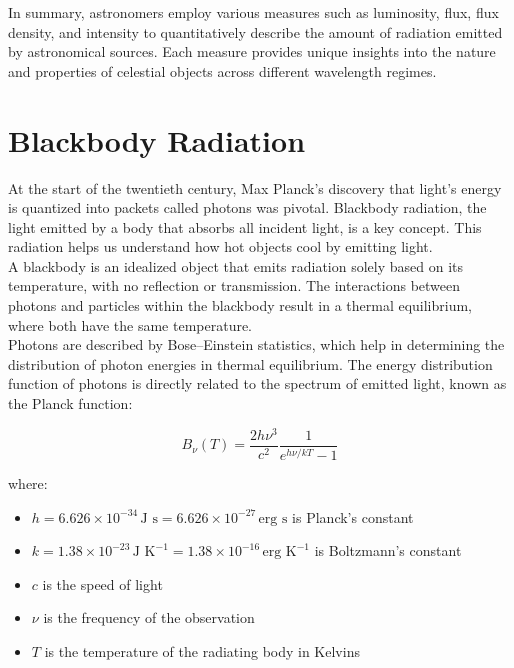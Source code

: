 In summary, astronomers employ various measures such as luminosity, flux, flux density, and intensity to quantitatively describe the amount of radiation emitted by astronomical sources. Each measure provides unique insights into the nature and properties of celestial objects across different wavelength regimes.

\section{Blackbody Radiation}
\label{sec:blackbodyradiation}

At the start of the twentieth century, Max Planck's discovery that light's energy is quantized into packets called photons was pivotal. Blackbody radiation, the light emitted by a body that absorbs all incident light, is a key concept. This radiation helps us understand how hot objects cool by emitting light. \\

A blackbody is an idealized object that emits radiation solely based on its temperature, with no reflection or transmission. The interactions between photons and particles within the blackbody result in a thermal equilibrium, where both have the same temperature. \\

Photons are described by Bose–Einstein statistics, which help in determining the distribution of photon energies in thermal equilibrium. The energy distribution function of photons is directly related to the spectrum of emitted light, known as the Planck function:

\begin{equation}
	B_\nu (T) = \frac{2h\nu^3}{c^2} \frac{1}{e^{h\nu/kT} - 1}
	\label{eq:planckfunctionfrequency}
\end{equation}


where:
\begin{itemize}
    \item \(h = 6.626 \times 10^{-34} \, \text{J s} = 6.626 \times 10^{-27} \, \text{erg s}\) is Planck’s constant
    \item \(k = 1.38 \times 10^{-23} \, \text{J K}^{-1} = 1.38 \times 10^{-16} \, \text{erg K}^{-1}\) is Boltzmann’s constant
    \item \(c\) is the speed of light
    \item \(\nu\) is the frequency of the observation
    \item \(T\) is the temperature of the radiating body in Kelvins
\end{itemize}

